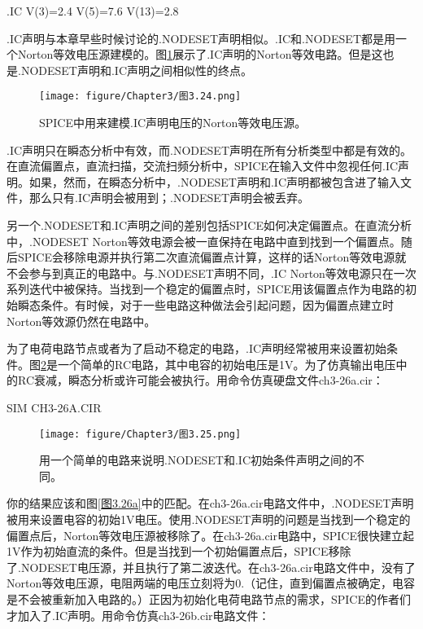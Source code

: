 .IC V(3)=2.4 V(5)=7.6 V(13)=2.8

.IC声明与本章早些时候讨论的.NODESET声明相似。.IC和.NODESET都是用一个Norton等效电压源建模的。图\ref{图3.24}展示了.IC声明的Norton等效电路。但是这也是.NODESET声明和.IC声明之间相似性的终点。
\begin{figure}[htbp]
\small
    \centering
    \texttt{[image: figure/Chapter3/图3.24.png]}
    \caption{SPICE中用来建模.IC声明电压的Norton等效电压源。}
    \label{图3.24}
\end{figure}

.IC声明只在瞬态分析中有效，而.NODESET声明在所有分析类型中都是有效的。在直流偏置点，直流扫描，交流扫频分析中，SPICE在输入文件中忽视任何.IC声明。如果，然而，在瞬态分析中，.NODESET声明和.IC声明都被包含进了输入文件，那么只有.IC声明会被用到；.NODESET声明会被丢弃。

另一个.NODESET和.IC声明之间的差别包括SPICE如何决定偏置点。在直流分析中，.NODESET Norton等效电源会被一直保持在电路中直到找到一个偏置点。随后SPICE会移除电源并执行第二次直流偏置点计算，这样的话Norton等效电源就不会参与到真正的电路中。与.NODESET声明不同，.IC Norton等效电源只在一次系列迭代中被保持。当找到一个稳定的偏置点时，SPICE用该偏置点作为电路的初始瞬态条件。有时候，对于一些电路这种做法会引起问题，因为偏置点建立时Norton等效源仍然在电路中。

为了电荷电路节点或者为了启动不稳定的电路，.IC声明经常被用来设置初始条件。图\ref{图3.25}是一个简单的RC电路，其中电容的初始电压是1V。为了仿真输出电压中的RC衰减，瞬态分析或许可能会被执行。用命令仿真硬盘文件ch3-26a.cir：

SIM CH3-26A.CIR

\begin{figure}[htbp]
\small
    \centering
    \texttt{[image: figure/Chapter3/图3.25.png]}
    \caption{用一个简单的电路来说明.NODESET和.IC初始条件声明之间的不同。}
    \label{图3.25}
\end{figure}

你的结果应该和图\ref{图3.26a}中的匹配。在ch3-26a.cir电路文件中，.NODESET声明被用来设置电容的初始1V电压。使用.NODESET声明的问题是当找到一个稳定的偏置点后，Norton等效电压源被移除了。在ch3-26a.cir电路中，SPICE很快建立起1V作为初始直流的条件。但是当找到一个初始偏置点后，SPICE移除了.NODESET电压源，并且执行了第二波迭代。在ch3-26a.cir电路文件中，没有了Norton等效电压源，电阻两端的电压立刻将为0.（记住，直到偏置点被确定，电容是不会被重新加入电路的。）正因为初始化电荷电路节点的需求，SPICE的作者们才加入了.IC声明。用命令仿真ch3-26b.cir电路文件：

